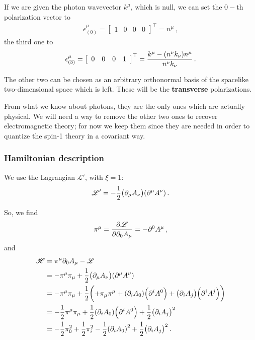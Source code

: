 \documentclass[main.tex]{subfiles}
\begin{document}
If we are given the photon wavevector \(k^{\mu }\), which is null, we can set the \(0-\)th polarization vector to 
%
\begin{align}
\epsilon^{\mu }_{(0)} = \left[\begin{array}{cccc}
1 & 0 & 0 & 0
\end{array}\right]^{\top}
= n^{\mu }
\,,
\end{align}
%
the third one to 
%
\begin{align}
\epsilon^{\mu }_{(3)} = \left[\begin{array}{cccc}
0 & 0 & 0 & 1
\end{array}\right]^{\top}
= \frac{k^{\mu } - \qty(n^{\nu }k_{\nu })n^{\mu }}{n^{\nu }k_{\nu }}
\,.
\end{align}

The other two can be chosen as an arbitrary orthonormal basis of the spacelike two-dimensional space which is left.
These will be the \textbf{transverse} polarizations. 

From what we know about photons, they are the only ones which are actually physical. 
We will need a way to remove the other two ones to recover electromagnetic theory; for now we keep them since they are needed in order to quantize the spin-1 theory in a covariant way. 

\subsubsection{Hamiltonian description}

We use the Lagrangian \(\mathscr{L}'\), with \(\xi =1 \): 
%
\begin{align}
\mathscr{L}' = - \frac{1}{2} \qty(\partial_{\mu } A_{\nu })\qty(\partial^{\mu } A^{\nu } )
\,.
\end{align}

So, we find 
%
\begin{align}
\pi^{\mu } = \pdv{\mathscr{L}}{\partial_0 A_{\mu }}
= - \partial^{0} A^{\mu }
\,,
\end{align}
%
and 
%
\begin{subequations}
\begin{align}
\mathscr{H} &= \pi^{\mu } \partial_0 A_{\mu }
- \mathscr{L}   \\
&= - \pi^{\mu } \pi_{\mu }
+ \frac{1}{2} \qty(\partial_{\mu } A_{\nu })\qty(\partial^{\mu } A^{\nu })  \\
&= - \pi^{\mu } \pi_{\mu } + \frac{1}{2} \qty(+ \pi_{\mu }\pi^{\mu } + \qty( \partial_{i } A_{0}) \qty(\partial^{i }A^{0})
+ \qty(\partial_{i} A_{j}) \qty(\partial^{i} A^{j}) )  \\
&= - \frac{1}{2} \pi^{\mu } \pi_{\mu }
+ \frac{1}{2}\qty(\partial_{i } A_{0})\qty(\partial^{i }A^{0})
+ \frac{1}{2} \qty(\partial_{i } A_{j})^2  \\
&=-\frac{1}{2} \pi_{0}^2
+ \frac{1}{2} \pi_{i}^2
- \frac{1}{2}\qty(\partial_{i} A_{0})^2
+ \frac{1}{2} \qty(\partial_{i } A_{j})^2 
\,.
\end{align}
\end{subequations}
\end{document}
